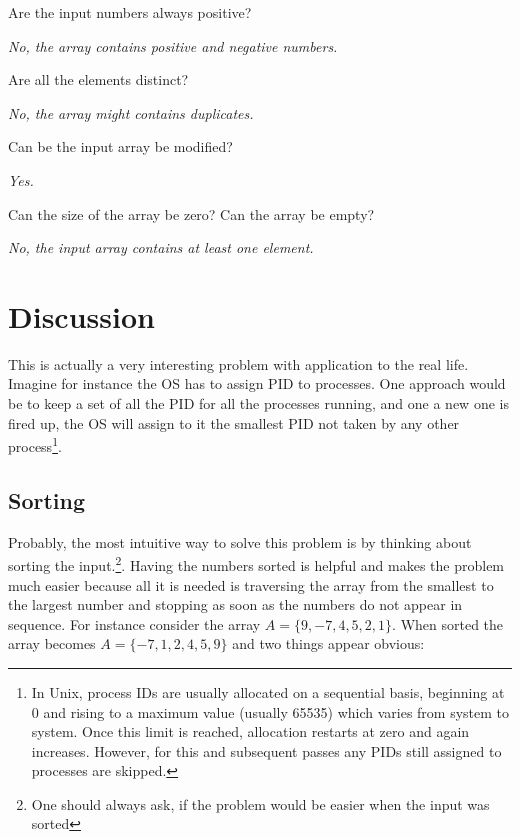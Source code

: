 \begin{QandA}
	\item Are the input numbers always positive?
	\begin{answered}
		\textit{No, the array contains positive and negative numbers.}
	\end{answered}

	\item Are all the elements distinct?
	\begin{answered}
		\textit{No, the array might contains duplicates.}
	\end{answered}
	
	\item Can be the input array be modified?
	\begin{answered}
		\textit{Yes.}
	\end{answered}

	\item Can the size of the array be zero? Can the array be empty?
	\begin{answered}
		\textit{No, the input array contains at least one element.}
	\end{answered}

\end{QandA}

\section{Discussion}
\label{first_positive_missing:sec:discussion}
This is actually a very interesting problem with application to the real life. Imagine for instance the OS has to assign PID to processes. One approach would be to keep a set of all the PID for all the processes running, and one a new one is fired up, the OS will assign to it the smallest PID not taken by any other process\footnote{In Unix, process IDs are usually allocated on a sequential basis, beginning at 0 and rising to a maximum value (usually 65535) which varies from system to system. Once this limit is reached, allocation restarts at zero and again increases. However, for this and subsequent passes any PIDs still assigned to processes are skipped.}.

\subsection{Sorting}
\label{first_positive_missing:sec:sorting}
Probably, the most intuitive way to solve this problem is by thinking about sorting the input.\footnote{One should always ask, if the problem would be easier when the input was sorted}. Having the numbers sorted is helpful and makes the problem much easier because all it is needed is traversing the array from the smallest to the largest number and stopping as soon as the numbers do not appear in sequence. 
For instance consider the array $A=\{ 9,-7,4,5,2,1\}$. When sorted the array becomes $A=\{ -7,1,2,4,5,9\}$ and two things appear obvious:

